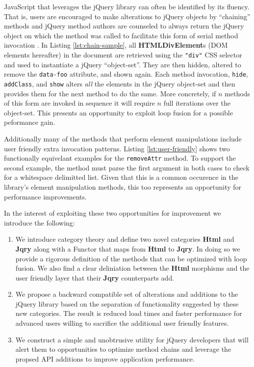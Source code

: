 \documentclass[preprint, leqno]{sigplanconf}
\begin{document}
JavaScript that leverages the jQuery library can often be identified by its fluency. That is, users are encouraged to make alterations to jQuery objects by ``chaining'' methods and jQuery method authors are counseled to always return the jQuery object on which the method was called to facilitate this form of serial method invocation \cite{bib:chaining}. In Listing \ref{lst:chain-sample}, all \textbf{HTMLDivElement}s (DOM elements hereafter) in the document are retrieved using the \verb|"div"| CSS selector and used to instantiate a jQuery ``object-set''. They are then hidden, altered to remove the \verb|data-foo| attribute, and shown again. Each method invocation, \verb|hide|, \verb|addClass|, and \verb|show| alters \textit{all} the elements in the jQuery object-set and then provides them for the next method to do the same. More concretely, if \begin{math}n\end{math} methods of this form are invoked in sequence it will require \begin{math}n\end{math} full iterations over the object-set. This presents an opportunity to exploit loop fusion for a possible peformance gain.

Additionally many of the methods that perform element manipulations include user friendly extra invocation patterns. Listing \ref{lst:user-friendly} shows two functionally equivelant examples for the \verb|removeAttr| method. To support the second example, the method must parse the first argument in both cases to check for a whitespace delimitted list. Given that this is a common occurence in the library's element manipulation methods, this too represents an opportunity for performance improvements.

In the interest of exploiting these two opportunities for improvement we introduce the following:

\begin{enumerate}
\item We introduce category theory and define two novel categories \textbf{Html} and \textbf{Jqry} along with a Functor that maps from \textbf{Html} to \textbf{Jqry}. In doing so we provide a rigorous definition of the methods that can be optimized with loop fusion. We also find a clear deliniation between the \textbf{Html} morphisms and the user friendly layer that their \textbf{Jqry} counterparts add.
\item We propose a backward compatible set of alterations and additions to the jQuery library based on the separation of functionality suggested by these new categories. The result is reduced load times and faster performance for advanced users willing to sacrifice the additional user friendly features.
\item We construct a simple and unobtrusive utility for jQuery developers that will alert them to opportunities to optimize method chains and leverage the propsed API additions to improve application performance.
\end{enumerate}
\end{document}
